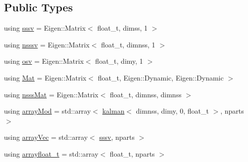 \subsection*{Public Types}
\begin{DoxyCompactItemize}
\item 
using \hyperlink{classrbpf__kalman_a616e56c08c1a6b476e065b2200433915}{sssv} = Eigen\+::\+Matrix$<$ float\+\_\+t, dimss, 1 $>$
\item 
using \hyperlink{classrbpf__kalman_aea6e6dd087b2fca63be4e480dcf0d1c3}{nsssv} = Eigen\+::\+Matrix$<$ float\+\_\+t, dimnss, 1 $>$
\item 
using \hyperlink{classrbpf__kalman_ae6e59c034c1b0abc7871887ae088055e}{osv} = Eigen\+::\+Matrix$<$ float\+\_\+t, dimy, 1 $>$
\item 
using \hyperlink{classrbpf__kalman_a736704f31949e04f537aa8b7263e44af}{Mat} = Eigen\+::\+Matrix$<$ float\+\_\+t, Eigen\+::\+Dynamic, Eigen\+::\+Dynamic $>$
\item 
using \hyperlink{classrbpf__kalman_afb337a9e8f4048c0eae2971ea61f96d5}{nsss\+Mat} = Eigen\+::\+Matrix$<$ float\+\_\+t, dimnss, dimnss $>$
\item 
using \hyperlink{classrbpf__kalman_a99e5cb365f01f83962440f29357744d9}{array\+Mod} = std\+::array$<$ \hyperlink{classkalman}{kalman}$<$ dimnss, dimy, 0, float\+\_\+t $>$, nparts $>$
\item 
using \hyperlink{classrbpf__kalman_ad0c2ef4db6363157244741517daae136}{array\+Vec} = std\+::array$<$ \hyperlink{classrbpf__kalman_a616e56c08c1a6b476e065b2200433915}{sssv}, nparts $>$
\item 
using \hyperlink{classrbpf__kalman_a77493b35e7848d5bd91904701adabbbc}{arrayfloat\+\_\+t} = std\+::array$<$ float\+\_\+t, nparts $>$
\end{DoxyCompactItemize}
